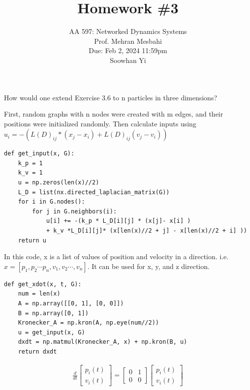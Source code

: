 \documentclass{article}
\begin{document}
\setcounter{problem}{0}
\title{Homework \#3}
\author{
    \normalsize{AA 597: Networked Dynamics Systems}\\
    \normalsize{Prof. Mehran Mesbahi}\\
    \normalsize{Due: Feb 2, 2024 11:59pm}\\
    \normalsize{Soowhan Yi}
}
\date{{}}
\maketitle


\begin{problem}
    How would one extend Exercise 3.6 to n particles in three dimensions?

    First, random graphs with n nodes were created with m edges, and their positions were initialized randomly.  Then calculate inputs using $u_i = -(L(D)_{ij} * (x_j - x_i) + L(D)_{ij}( v_j - v_i)) $
    \begin{verbatim}
def get_input(x, G):
    k_p = 1
    k_v = 1
    u = np.zeros(len(x)//2)
    L_D = list(nx.directed_laplacian_matrix(G))
    for i in G.nodes():
        for j in G.neighbors(i):
            u[i] += -(k_p * L_D[i][j] * (x[j]- x[i] ) 
            + k_v *L_D[i][j]* (x[len(x)//2 + j] - x[len(x)//2 + i] ))
    return u
    \end{verbatim}
    In this code, x is a list of values of position and velocity in a direction. i.e. $x = [p_1, p_2 \cdots p_n, v_1, v_2 \cdots, v_n]$. It can be used for x, y, and z direction. 
    \begin{verbatim}
def get_xdot(x, t, G):
    num = len(x)
    A = np.array([[0, 1], [0, 0]])
    B = np.array([0, 1])
    Kronecker_A = np.kron(A, np.eye(num//2))
    u = get_input(x, G)
    dxdt = np.matmul(Kronecker_A, x) + np.kron(B, u)
    return dxdt 
    \end{verbatim}
    \begin{align*}
        \frac{d}{dt} 
        \begin{bmatrix*}
            p_i(t)\\
            v_i(t)  
        \end{bmatrix*}
        = \begin{bmatrix*}
            0 & 1\\
            0 & 0 
        \end{bmatrix*}
        \begin{bmatrix*}
            p_i(t)\\
            v_i(t)  
        \end{bmatrix*}

\end{align*}
\end{problem}
\end{document}
